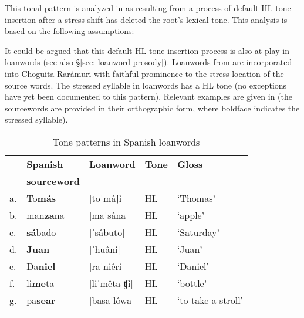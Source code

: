 This tonal pattern is analyzed in \citet{caballero2021grammatical} as resulting from a process of default HL tone insertion after a stress shift has deleted the root's lexical tone. This analysis is based on the following assumptions:

\ea\label{ex: default HL tone insertion}
    \z
\z

It could be argued that this default HL tone insertion process is also at play in  loanwords \parencite{caballero2013procesos} (see also §\ref{sec: loanword prosody}). Loanwords from  are incorporated into Choguita Rarámuri with faithful prominence to the stress location of the source words. The stressed syllable in loanwords has a HL tone (no exceptions have yet been documented to this pattern). Relevant examples are given in  (the  sourcewords are provided in their orthographic form, where boldface indicates the stressed syllable).

\begin{table}
\caption{Tone patterns in Spanish loanwords}
\label{tab:loanwords}

\begin{tabularx}{\textwidth}{lXXXX}
\lsptoprule
&\textbf{Spanish} & \textbf{Loanword}  & \textbf{Tone} & \textbf{Gloss}\\
&\textbf{sourceword} & &  & \\
\midrule
a.& To\textbf{más} &	 [toˈmâʃi] 	&	HL 	&	‘Thomas’\\
b.& man\textbf{za}na & [maˈsâna] &		HL &		‘apple’ \\
c.& \textbf{sá}bado &	[ˈsâbuto] 	&	HL 	&	‘Saturday’\\
d.& \textbf{Juan} 	& [ˈhuâni]  &		HL	&	‘Juan’\\
e.& Da\textbf{niel} &	[raˈniêri] &		HL &		‘Daniel’\\
f.& li\textbf{me}ta &	[liˈmêta-ʧi] &	HL 	&	‘bottle’\\
g.& pa\textbf{sear}	& [basaˈlôwa]	&	HL	&	`to take a stroll'\\
\lspbottomrule
\end{tabularx}
\end{table}

